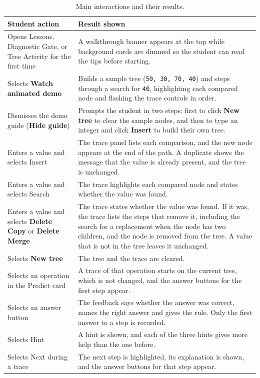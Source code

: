 \begin{table}[H]
\centering
\small
\caption{Main interactions and their results.}
\label{tab:flow}
\begin{tabularx}{\textwidth}{p{4.2cm} X}
\toprule
Student action & Result shown \\
\midrule
Opens Lessons, Diagnostic Gate, or Tree Activity for the first time & A walkthrough banner appears at the top while background cards are dimmed so the student can read the tips before starting. \\
Selects \textbf{Watch animated demo} & Builds a sample tree (\texttt{50, 30, 70, 40}) and steps through a search for \texttt{40}, highlighting each compared node and flashing the trace controls in order. \\
Dismisses the demo guide (\textbf{Hide guide}) & Prompts the student in two steps: first to click \textbf{New tree} to clear the sample nodes, and then to type an integer and click \textbf{Insert} to build their own tree. \\
Enters a value and selects Insert & The trace panel lists each comparison, and the new node appears at the end of the path. A duplicate shows the message that the value is already present, and the tree is unchanged. \\
Enters a value and selects Search & The trace highlights each compared node and states whether the value was found. \\
Enters a value and selects \textbf{Delete Copy} or \textbf{Delete Merge} & The trace states whether the value was found. If it was, the trace lists the steps that remove it, including the search for a replacement when the node has two children, and the node is removed from the tree. A value that is not in the tree leaves it unchanged. \\
Selects \textbf{New tree} & The tree and the trace are cleared. \\
Selects an operation in the Predict card & A trace of that operation starts on the current tree, which is not changed, and the answer buttons for the first step appear. \\
Selects an answer button & The feedback says whether the answer was correct, names the right answer and gives the rule. Only the first answer to a step is recorded. \\
Selects Hint & A hint is shown, and each of the three hints gives more help than the one before. \\
Selects Next during a trace & The next step is highlighted, its explanation is shown, and the answer buttons for that step appear. \\

\end{tabularx}
\end{table}
